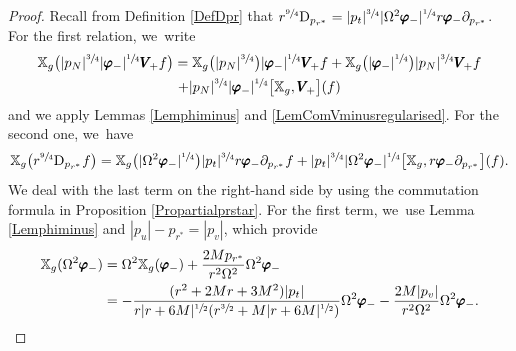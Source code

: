 \documentclass[10pt]{amsart}
\theoremstyle{plain}
\theoremstyle{definition}
\newcommand\T{{\mathbb{X}}}
\begin{document}
\begin{proof}
Recall from Definition \ref{DefDpr} that $r^{\sfrac{9}{4}} \mathrm{D}_{p_{r^*}} = |p_t|^{\sfrac{3}{4}} |\Omega^2 \pmb{\varphi}_-|^{\sfrac{1}{4}} r \pmb{\varphi}_- \partial_{p_{r^*}}$. For the first relation, we~write
\begin{multline*}
\T_g \bigl(|p_N|^{\sfrac{3}{4}}|\pmb{\varphi}_-|^{\sfrac{1}{4}}\pmb{V}_{\! +} f \bigr) =\T_g \bigl(|p_N|^{\sfrac{3}{4}} \bigr)|\pmb{\varphi}_-|^{\sfrac{1}{4}}\pmb{V}_{\! +} f+\T_g \bigl(|\pmb{\varphi}_-|^{\sfrac{1}{4}} \bigr) |p_N|^{\sfrac{3}{4}} \pmb{V}_{\! +} f \\
+ |p_N|^{\sfrac{3}{4}} |\pmb{\varphi}_-|^{\sfrac{1}{4}} \bigl[\T_g,\pmb{V}_{\! +} \bigr](f)
\end{multline*}
and we apply Lemmas \ref{Lemphiminus} and \ref{LemComVminusregularised}. For the second one, we~have
\[
\T_g \bigl(r^{\sfrac{9}{4}} \mathrm{D}_{p_{r^*}} f \bigr) = \T_g \bigl(|\Omega^2 \pmb{\varphi}_-|^{\sfrac{1}{4}} \bigr) |p_t|^{\sfrac{3}{4}} r \pmb{\varphi}_- \partial_{p_{r^*}}f + |p_t|^{\sfrac{3}{4}} |\Omega^2 \pmb{\varphi}_-|^{\sfrac{1}{4}} \bigl[\T_g, r \pmb{\varphi}_- \partial_{p_{r^*}} \bigr](f).
\]
We deal with the last term on the right-hand side by using the commutation formula in Proposition \ref{Propartialprstar}. For the first term, we~use Lemma \ref{Lemphiminus} and $|p_u|-p_{r^*}=|p_v|$, which provide
\begin{equation}\label{eq:phitilde}
\begin{aligned}
\T_g(\Omega^2 \pmb{\varphi}_-) & = \Omega^2\T_g(\pmb{\varphi}_-)+\frac{2Mp_{r^*}}{r^2 \Omega^2}\Omega^2 \pmb{\varphi}_- \\
& = -\frac{(r^2+2Mr+3M^2)|p_t|}{r|r+6M|^{\sfrac{1}{2}}(r^{\sfrac{3}{2}}+M|r+6M|^{\sfrac{1}{2}}) } \Omega^2 \pmb{\varphi}_--\frac{2M|p_v|}{r^2 \Omega^2} \Omega^2 \pmb{\varphi}_-. 
\end{aligned}\qedhere
\end{equation}
\end{proof}
\end{document}
